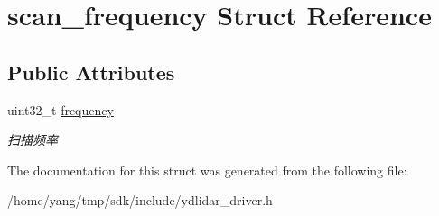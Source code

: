 \hypertarget{structscan__frequency}{}\section{scan\+\_\+frequency Struct Reference}
\label{structscan__frequency}
\subsection*{Public Attributes}
\begin{DoxyCompactItemize}
\item 
uint32\+\_\+t \hyperlink{structscan__frequency_ae4f2152e77416cff02f44452355f2808}{frequency}\hypertarget{structscan__frequency_ae4f2152e77416cff02f44452355f2808}{}\label{structscan__frequency_ae4f2152e77416cff02f44452355f2808}

\begin{DoxyCompactList}\small\item\em 扫描频率 \end{DoxyCompactList}\end{DoxyCompactItemize}


The documentation for this struct was generated from the following file\+:\begin{DoxyCompactItemize}
\item 
/home/yang/tmp/sdk/include/ydlidar\+\_\+driver.\+h\end{DoxyCompactItemize}
